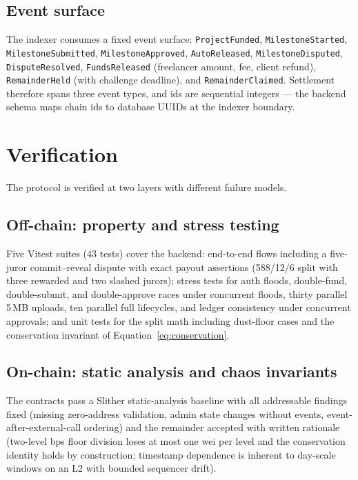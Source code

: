 \documentclass[11pt,letterpaper]{article}
\begin{document}
\subsection{Event surface}

{\sloppy
The indexer consumes a fixed event surface: \texttt{ProjectFunded},
\texttt{MilestoneStarted}, \texttt{MilestoneSubmitted},
\texttt{MilestoneApproved}, \texttt{AutoReleased}, \texttt{MilestoneDisputed},
\texttt{DisputeResolved}, \texttt{FundsReleased} (freelancer amount, fee, client
refund), \texttt{RemainderHeld} (with challenge deadline), and
\texttt{RemainderClaimed}. Settlement therefore spans three event types, and ids are
sequential integers --- the backend schema maps chain ids to database UUIDs at the
indexer boundary.\par}

\section{Verification}\label{sec:verification}

The protocol is verified at two layers with different failure models.

\subsection{Off-chain: property and stress testing}

Five Vitest suites (43 tests) cover the backend: end-to-end flows including a
five-juror commit--reveal dispute with exact payout assertions (588/12/6 split with
three rewarded and two slashed jurors); stress tests for auth floods, double-fund,
double-submit, and double-approve races under concurrent floods, thirty parallel
5\,MB uploads, ten parallel full lifecycles, and ledger consistency under concurrent
approvals; and unit tests for the split math including dust-floor cases and the
conservation invariant of Equation~\eqref{eq:conservation}.

\subsection{On-chain: static analysis and chaos invariants}

The contracts pass a Slither static-analysis baseline with all addressable findings
fixed (missing zero-address validation, admin state changes without events,
event-after-external-call ordering) and the remainder accepted with written
rationale (two-level bps floor division loses at most one wei per level and the
conservation identity holds by construction; timestamp dependence is inherent to
day-scale windows on an L2 with bounded sequencer drift).
\end{document}
